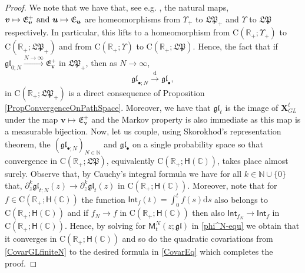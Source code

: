 \documentclass[]{article}
\begin{document}
\begin{proof}
We note that we have that, see e.g. \cite{Theo-RandomEntireFunctions}, the natural maps, $\boldsymbol{v}\mapsto \mathfrak{E}_{\boldsymbol{v}}^+ \textnormal{ and } \boldsymbol{u}\mapsto\mathfrak{E}_{\boldsymbol{u}}$
are homeomorphisms from $\Upsilon_+$ to $\mathfrak{LP}_+$ and $\Upsilon$ to $\mathfrak{LP}$ respectively. In particular, this lifts to a homeomorphism from  $\mathrm{C}(\mathbb{R}_+;\Upsilon_+)$ to $\mathrm{C}(\mathbb{R}_+;\mathfrak{LP}_+)$  and from $\mathrm{C}(\mathbb{R}_+;\Upsilon)$ to $\mathrm{C}(\mathbb{R}_+;\mathfrak{LP})$. Hence, the fact that if $\mathfrak{gl}_{0;N} \overset{N \to \infty}{\longrightarrow} \mathfrak{E}_{\boldsymbol{v}}^+$ in $\mathfrak{LP}_+$, then as $N\to \infty$,
\begin{equation*}
\mathfrak{gl}_{\bullet;N}\overset{\mathrm{d}}{\longrightarrow} \mathfrak{gl}_\bullet,
\end{equation*}
in $\mathrm{C}(\mathbb{R}_+;\mathfrak{LP}_+)$ is a direct consequence of Proposition \ref{PropConvergenceOnPathSpace}. Moreover, we have that $\mathfrak{gl}_t$ is the image of $\mathbf{X}_{GL}^t$ under the map  $\boldsymbol{v}\mapsto \mathfrak{E}_{\boldsymbol{v}}^+$ and the Markov property is also immediate as this map is a measurable bijection. Now, let us couple, using Skorokhod's representation theorem, the $(\mathfrak{gl}_{\bullet;N})_{N \in \mathbb{N}}$ and $\mathfrak{gl}_{\bullet}$ on a single probability space so that convergence in $\mathrm{C}(\mathbb{R}_+;\mathfrak{LP})$, equivalently $\mathrm{C}(\mathbb{R}_+;\mathsf{H}(\mathbb{C}))$, takes place almost surely. Observe that, by Cauchy's integral formula we have for all $k\in \mathbb{N}\cup\{0\}$ that, $\partial_z^k\mathfrak{gl}_{t;N}(z)\longrightarrow\partial_z^k\mathfrak{gl}_{t}(z)$ in $\mathrm{C}(\mathbb{R}_+;\mathsf{H}(\mathbb{C}))$. Moreover, note that for $f\in \mathrm{C}(\mathbb{R}_+;\mathsf{H}(\mathbb{C}))$ the function $\mathsf{Int}_f(t)=\int_0^tf(s)\mathrm{d}s$ also belongs to $\mathrm{C}(\mathbb{R}_+;\mathsf{H}(\mathbb{C}))$ and if $f_N \longrightarrow f$ in $\mathrm{C}(\mathbb{R}_+;\mathsf{H}(\mathbb{C}))$ then also $\mathsf{Int}_{f_N} \longrightarrow \mathsf{Int}_{f}$ in $\mathrm{C}(\mathbb{R}_+;\mathsf{H}(\mathbb{C}))$. Hence, by solving for $\mathsf{M}_t^N(z;\mathfrak{gl})$ in \eqref{phi^N-equ} we obtain that it converges in $\mathrm{C}(\mathbb{R}_+;\mathsf{H}(\mathbb{C}))$ and so do the quadratic covariations from \eqref{CovarGLfiniteN} to the desired formula in \eqref{CovarEq} which completes the proof.
\end{proof}
\end{document}

